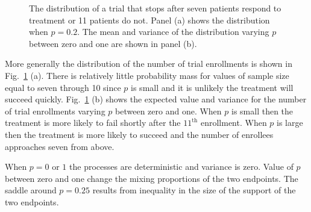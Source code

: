 \documentclass[review]{elsarticle}
\begin{document}
\begin{figure}[bp!]
\centering
{}
\hfill
{}
\caption{
The distribution of a trial that stops after seven patients respond to treatment
or 11 patients do not. Panel (a) shows the distribution when
$p = 0.2$. The mean and variance of the distribution varying $p$ 
between zero and one are shown in panel (b).
}
\label{fig:exp-and-var}
\end{figure}

More generally the distribution of the number of trial enrollments is shown in 
Fig.~\ref{fig:exp-and-var} (a). There is relatively little probability mass
for values of sample size equal to seven through 10 since $p$ is small and it 
is unlikely the treatment will succeed quickly.
Fig.~\ref{fig:exp-and-var} (b) shows the expected value and variance for the
number of trial enrollments varying $p$ between zero and one. When $p$ is
small then the treatment
is more likely to fail shortly after the $11^{\text{th}}$ enrollment.
When $p$ is large then the treatment is more likely to succeed and the 
number of enrollees approaches seven from above. 

When $p=0$ or $1$ the processes are deterministic and variance is zero.
Value of $p$ between zero and one change the mixing proportions of 
the two endpoints. The saddle around $p=0.25$ results from inequality 
in the size of the support of the two endpoints.
\end{document}
